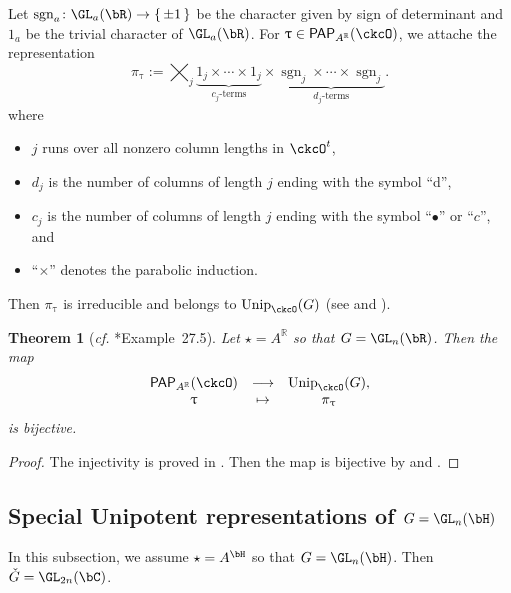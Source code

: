 \documentclass[12pt,a4paper]{amsart}
\newcommand{\sgn}{\operatorname{sgn}}
\newcommand{\R}{\mathbb R}
\numberwithin{equation}{section}
\newtheorem{thm}{Theorem}[section]
\theoremstyle{remark}
\def\cf{\emph{cf.} }
\def\Unip{\mathrm{Unip}}
\def\ckG{\check{G}}
\def\PP{\mathsf{PAP}}
\begin{document}
Let $\sgn_a\colon \GL_a(\bR)\rightarrow \set{\pm 1}$ be the character given by sign of determinant
and $1_a$ be the trivial character of $\GL_a(\bR)$.
For
$\uptau\in \PP_{A^\R}(\ckcO)$, we attache the representation
\begin{equation}\label{eq:u.GLR}
  \pi_\uptau :=
  \bigtimes_{j} \underbrace{1_j \times \cdots \times 1_j}_{c_j\text{-terms}}\times
  \underbrace{\sgn_j \times \cdots \times {\sgn_j} }_{d_j\text{-terms}}.
\end{equation}
where
\begin{itemize}
  \item $j$ runs over all nonzero column lengths in $\ckcO^t$,
  \item $d_j$ is the number of columns of length $j$ ending with the symbol
        ``d'',
  \item $c_j$ is the number of columns of length $j$ ending with the symbol
        ``$\bullet$'' or ``$c$'', and
  \item ``$\times$'' denotes the parabolic induction.
\end{itemize}
Then $\pi_{\uptau}$ is irreducible and belongs to $\Unip_{\ckcO}(G)$ (see  \cite[Theorem 3.8]{V.GL} and \cite[Example~27.5]{ABV}).

\begin{thm}[\cf \cite{ABV}*{Example~27.5}] \label{thm:mainR} Let $\star =A^\R$ so that $G =\GL_n(\bR)$. Then the map
  \[
    \begin{array}{ccc}
      \PP_{A^\R}(\ckcO) & \longrightarrow & \Unip_{\ckcO}(G),\\
      \uptau & \mapsto & \pi_{\uptau}
    \end{array}
  \]
  is bijective.
\end{thm}
\begin{proof}
  The injectivity is proved in  \cite[Theorem 3.8]{V.GL}.
Then   the map is bijective by  and .
\end{proof}

\subsection{Special Unipotent representations of $G=\GL_{n}(\bH)$} In this subsection, we assume $\star=A^{\bH}$ so that $G = \GL_{n}(\bH)$. Then
$\ckG = \GL_{2n}(\bC)$.
\end{document}
